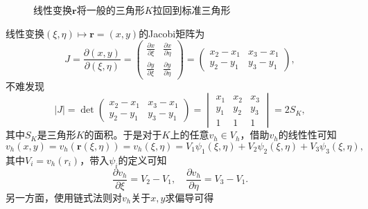 \documentclass[a4paper,10pt]{ctexart}
\begin{document}
\begin{figure}[htpb]
    \centering
    \caption{线性变换$ \bm{r} $将一般的三角形$ K $拉回到标准三角形}
    \label{fig:triangle_tran}
\end{figure}

线性变换$ (\xi,\eta)\mapsto \bm{r} = (x,y) $的Jacobi矩阵为
\begin{equation}
    J = \dfrac{\partial (x,y)}{\partial (\xi,\eta)} =
    \begin{pmatrix}
        \frac{\partial x}{\partial \xi} & \frac{\partial x}{\partial \eta}\\
        \frac{\partial y}{\partial \xi} & \frac{\partial y}{\partial \eta}
    \end{pmatrix} = 
    \begin{pmatrix}
        x_2-x_1 & x_3-x_1\\
        y_2-y_1 & y_3-y_1
    \end{pmatrix},
\end{equation}
不难发现
\[
    |J| = \det \begin{pmatrix} 
        x_2-x_1 & x_3-x_1\\
        y_2-y_1 & y_3-y_1
    \end{pmatrix} = 
    \begin{vmatrix}
        x_1 & x_2 & x_3\\
        y_1 & y_2 & y_3\\
        1 & 1 & 1
    \end{vmatrix} = 2S_K,
\]
其中$ S_K $是三角形$ K $的面积。于是对于$ K $上的任意$ v_h\in V_h $，借助$ v_h $的线性性可知
\begin{equation}
    v_h(x,y) = v_h(\bm{r}(\xi,\eta)) = v_h(\xi,\eta) = V_1 \psi_1(\xi,\eta) + V_2 \psi_2(\xi,\eta) + V_3 \psi_3(\xi,\eta),
\end{equation}
其中$ V_i = v_h(r_i) $，带入$ \psi_i $的定义可知
\[
    \dfrac{\partial v_h}{\partial \xi} = V_2 - V_1,\quad \dfrac{\partial v_h}{\partial \eta} = V_3 - V_1.
\]
另一方面，使用链式法则对$ v_h $关于$ x,y $求偏导可得
\end{document}
